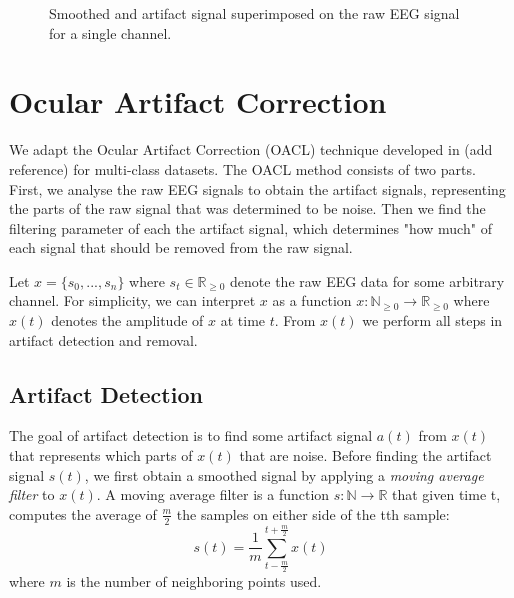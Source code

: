 \begin{figure*}%
\centering
\begin{adjustbox}{width=\textwidth}
	\newlength\figureheight
	\newlength\figurewidth
	\setlength\figureheight{6cm}
	\setlength\figurewidth{\textwidth}
	
\end{adjustbox}
\vspace{-2em}
\label{fig:oacl-signals}
\caption{Smoothed and artifact signal superimposed on the raw EEG signal for a single channel.}
\end{figure*}
\section{Ocular Artifact Correction}
We adapt the  Ocular Artifact Correction (OACL) technique developed in (add reference) for multi-class datasets. The OACL method consists of two parts. First, we analyse the raw EEG signals to obtain the artifact signals, representing the parts of the raw signal that was determined to be noise. Then we find the filtering parameter of each the artifact signal, which determines "how much" of each signal that should be removed from the raw signal. 

Let $x = \{s_0, ...,s_n\}$ where $s_t \in \mathbb{R}_{\geq 0}$ denote the raw EEG data for some arbitrary channel. For simplicity, we can interpret $x$ as a function $x : \mathbb{N}_{\geq 0} \rightarrow \mathbb{R}_{\geq 0}$ where $x(t)$ denotes the amplitude of $x$ at time $t$. 
From $x(t)$ we perform all steps in artifact detection and removal.


\subsection{Artifact Detection}
The goal of artifact detection is to find some artifact signal $a(t)$ from $x(t)$ that represents which parts of $x(t)$ that are noise. Before finding the artifact signal $s(t)$, we first obtain a smoothed signal by applying a \emph{moving average filter} to $x(t)$. A moving average filter is a function $s: \mathbb{N} \rightarrow \mathbb{R}$ that given time t, computes the average of $\frac{m}{2}$ the samples on either side of the tth sample:
\begin{equation}
\label{eq:movavg}
s(t) = \frac{1}{m}\sum_{t-\frac{m}{2}}^{t+\frac{m}{2}}x(t)
\end{equation}
where $m$ is the number of neighboring points used.

